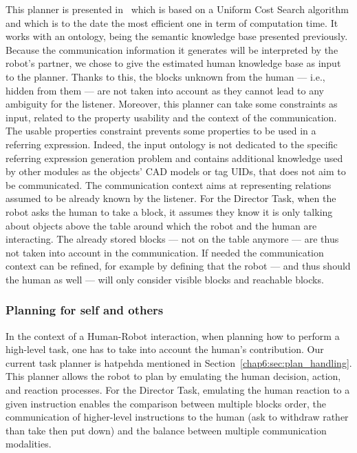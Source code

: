 \documentclass[a4paper,11pt,twoside]{StyleThese}
\begin{document}
This planner is presented in~\cite{buisan_2020_efficient} which is based on a Uniform Cost Search algorithm and which is to the date the most efficient one in term of computation time. It works with an ontology, being the semantic knowledge base presented previously. Because the communication information it generates will be interpreted by the robot's partner, we chose to give the estimated human knowledge base as input to the planner. Thanks to this, the blocks unknown from the human --- i.e., hidden from them --- are not taken into account as they cannot lead to any ambiguity for the listener. Moreover, this planner can take some constraints as input, related to the property usability and the context of the communication. The usable properties constraint prevents some properties to be used in a referring expression. Indeed, the input ontology is not dedicated to the specific referring expression generation problem and contains additional knowledge used by other modules as the objects' CAD models or tag UIDs, that does not aim to be communicated. The communication context aims at representing relations assumed to be already known by the listener. For the Director Task, when the robot asks the human to take a block, it assumes they know it is only talking about objects above the table around which the robot and the human are interacting. The already stored blocks --- not on the table anymore --- are thus not taken into account in the communication. If needed the communication context can be refined, for example by defining that the robot --- and thus should the human as well --- will only consider visible blocks and reachable blocks.

\subsubsection{Planning for self and others}

In the context of a Human-Robot interaction, when planning how to perform a high-level task, one has to take into account the human's contribution. Our current task planner is \acrshort{hatpehda} mentioned in Section~\ref{chap6:sec:plan_handling}. This planner allows the robot to plan by emulating the human decision, action, and reaction processes. For the Director Task, emulating the human reaction to a given instruction enables the comparison between multiple blocks order, the communication of higher-level instructions to the human (\eg ask to withdraw rather than take then put down) and the balance between multiple communication modalities.
\end{document}
